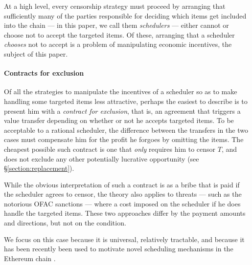 At a high level, every censorship strategy must proceed by arranging that sufficiently many of the parties responsible for deciding which items get included into the chain --- in this paper, we call them \emph{schedulers} --- either cannot or choose not to accept the targeted items.
%
Of these, arranging that a scheduler \emph{chooses} not to accept is a problem of manipulating economic incentives, the subject of this paper.
%


\paragraph{Contracts for exclusion}
%
Of all the strategies to manipulate the incentives of a scheduler so as to make handling some targeted items less attractive, perhaps the easiest to describe is to present him with a \emph{contract for exclusion}, that is, an agreement that triggers a value transfer depending on whether or not he accepts targeted items.
%
To be acceptable to a rational scheduler, the difference between the transfers in the two cases must compensate him for the profit he forgoes by omitting the items.
%
The cheapest possible such contract is one that \emph{only} requires him to censor $T$, and does not exclude any other potentially lucrative opportunity (see \S\ref{section:replacement}).

While the obvious interpretation of such a contract is as a bribe that is paid if the scheduler agrees to censor, the theory also applies to threats --- such as the notorious OFAC sanctions \cite{wright2022defi} --- where a cost imposed on the scheduler if he does handle the targeted items.
%
These two approaches differ by the payment amounts and directions, but not on the condition.

We focus on this case because it is universal, relatively tractable, and because it has been recently been used to motivate novel scheduling mechanisms in the Ethereum chain \cite{FPR,burian2024censorship}.




